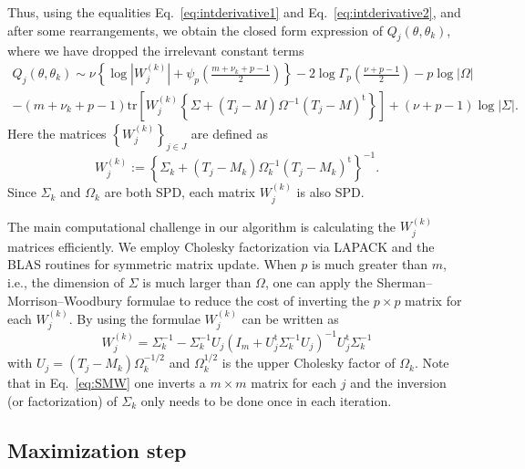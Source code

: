 \documentclass[english,listof=totoc]{scrartcl}
\begin{document}
Thus, using the equalities Eq.~\eqref{eq:intderivative1} and
Eq.~\eqref{eq:intderivative2}, and after some rearrangements, we
obtain the closed form expression of $Q_j(\theta,\theta_k)$, where we
have dropped the irrelevant constant terms
%
\begin{equation}
\begin{split}Q_j(\theta,\theta_k) \sim \nu\left\{\log|W_j^{(k)}|+\psi_{p}\left(\frac{m+\nu_k+p-1}{2}\right)\right\}-2\log\Gamma_{p}\left(\frac{\nu+p-1}{2}\right)-p\log|\Omega|\\
-(m+\nu_k+p-1)\textrm{tr}\left[W_j^{(k)}\left\{\Sigma+(T_j-M)\Omega^{-1}(T_j-M)^{\textrm{t}}\right\}\right]+(\nu+p-1)\log |\Sigma|.
\end{split}
\label{eq:fsimp}
\end{equation}
Here the matrices $\left\{W_j^{(k)}\right\}_{j\in J}$ are defined as
\begin{equation}
W_j^{(k)}:=\left\{\Sigma_k+(T_j-M_k)\Omega_k^{-1}(T_j-M_k)^{\textrm{t}}\right\}^{-1}.
\end{equation}
Since $\Sigma_k$ and $\Omega_k$ are both SPD, each matrix $W_j^{(k)}$
is also SPD.

The main computational challenge in our algorithm is calculating the
$W_j^{(k)}$ matrices efficiently. We employ Cholesky factorization via
LAPACK and the BLAS routines for symmetric
matrix update. When $p$ is much greater than $m$, i.e., the dimension
of $\Sigma$ is much larger than $\Omega$, one can apply the
Sherman--Morrison--Woodbury formulae \citep{doi:10.1137/1023004} to
reduce the cost of inverting the $p\times p$ matrix for each
$W_j^{(k)}$. By using the formulae $W_j^{(k)}$ can be written as
%
\begin{equation}
W_j^{(k)}=\Sigma_k^{-1}-\Sigma_k^{-1}U_j\left(I_m+U_j^{\textrm{t}}\Sigma_k^{-1}U_j\right)^{-1}U_j^{\textrm{t}}\Sigma_k^{-1}\label{eq:SMW}
\end{equation}
with $U_j=(T_j-M_k)\Omega_k^{-1/2}$ and $\Omega_k^{1/2}$ is the upper
Cholesky factor of $\Omega_k$. Note that in Eq.~\eqref{eq:SMW} one
inverts a $m\times m$ matrix for each $j$ and the inversion (or
factorization) of $\Sigma_k$ only needs to be done once in each
iteration.

\subsection{Maximization step}
\end{document}
